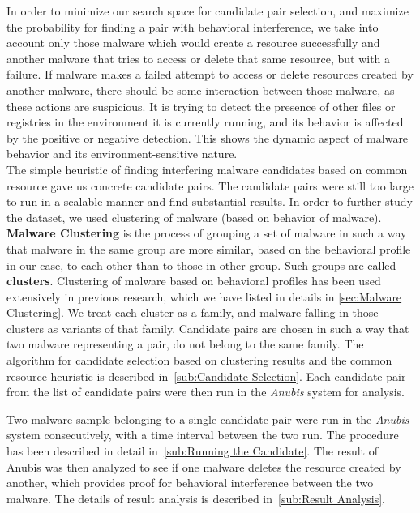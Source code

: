 In order to minimize our search space for candidate pair selection, and maximize the probability for finding a pair with behavioral interference, we take into account only those malware which would create a resource successfully and another malware that tries to access or delete that same resource, but with a failure.
If malware makes a failed attempt to access or delete resources created by another malware, there should be some interaction between those malware, as these actions are suspicious.
It is trying to detect the presence of other files or registries in the environment it is currently running, and its behavior is affected by the positive or negative detection.
This shows the dynamic aspect of malware behavior and its environment-sensitive nature.\\

The simple heuristic of finding interfering malware candidates based on common resource gave us concrete candidate pairs.  The candidate pairs were still too large to run in a scalable manner and find substantial results.
In order to further study the dataset, we used clustering of malware (based on behavior of malware).
\textbf{Malware Clustering} is the process of grouping a set of malware in such a way that malware in the same group are more similar, based on the behavioral profile in our case, to each other than to those in other group.
Such groups are called \textbf{clusters}.
Clustering of malware based on behavioral profiles has been used extensively in previous research, which we have listed in details in \autoref{sec:Malware Clustering}.
We treat each cluster as a family, and malware falling in those clusters as variants of that family.
Candidate pairs are chosen in such a way that two malware representing a pair, do not belong to the same family.
The algorithm for candidate selection based on clustering results and the common resource heuristic is described in~\autoref{sub:Candidate Selection}.
Each candidate pair from the list of candidate pairs were then run in the \emph{Anubis} system for analysis.

Two malware sample belonging to a single candidate pair were run in the \emph{Anubis} system consecutively, with a time interval between the two run.
The procedure has been described in detail in~\autoref{sub:Running the Candidate}.
The result of Anubis was then analyzed to see if one malware deletes the resource created by another, which provides proof for behavioral interference between the two malware.
The details of result analysis is described in~\autoref{sub:Result Analysis}.\\

